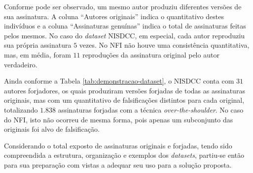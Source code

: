 Conforme pode ser observado, um mesmo autor produziu diferentes versões de sua assinatura. A coluna ``Autores originais'' indica o quantitativo destes indivíduos e a coluna ``Assinaturas genuínas'' indica o total de assinaturas feitas pelos mesmos. No caso do \emph{dataset} NISDCC, em especial, cada autor reproduziu sua própria assinatura $5$ vezes. No NFI não houve uma consistência quantitativa, mas, em média, foram $11$ reproduções da assinatura original pelo autor verdadeiro.

Ainda conforme a Tabela \ref{tab:demonstracao-dataset}, o NISDCC conta com $31$ autores forjadores, os quais produziram versões forjadas de todas as assinaturas originais, mas com um quantitativo de falsificações distintos para cada original, totalizando $1.838$ assinaturas forjadas com a técnica \emph{over-the-shoulder}. No caso do NFI, isto não ocorreu de mesma forma, pois apenas um subconjunto das originais foi alvo de falsificação.

Considerando o total exposto de assinaturas originais e forjadas, tendo sido compreendida a estrutura, organização e exemplos dos \emph{datasets}, partiu-se então para sua preparação com vistas a adequar seu uso para a solução proposta.
